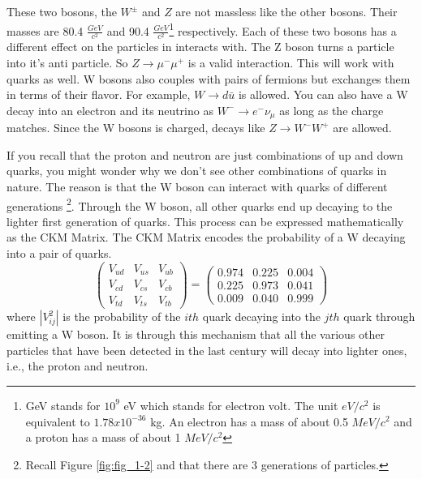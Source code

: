 These two bosons, the $W^{\pm}$ and $Z$ are not massless like the other bosons. Their masses are 80.4 $\frac{GeV}{c^2}$ and 90.4 $\frac{GeV}{c^2}$\footnote{GeV stands for $10^9$ eV which stands for electron volt. The unit $eV/c^2$ is equivalent to $1.78 x 10^{-36}$ kg. An electron has a mass of about 0.5 $MeV/c^2$ and a proton has a mass of about 1 $MeV/c^2$} respectively.
Each of these two bosons has a different effect on the particles in interacts with. The Z boson turns a particle into it's anti particle. So $ Z \rightarrow \mu^- \mu^+$ is a valid interaction. This will work with quarks as well.
W bosons also couples with pairs of fermions but exchanges them in terms of their flavor. For example, $W \rightarrow d \bar{u}$ is allowed.
You can also have a W decay into an electron and its neutrino as $W^- \rightarrow e^- \nu_{\mu}$ as long as the charge matches. Since the W bosons is charged, 
decays like $Z \rightarrow W^- W^+$ are allowed.

If you recall that the proton and neutron are just combinations of up and down quarks, you might wonder why we don't see other combinations of quarks in nature.
The reason is that the W boson can interact with quarks of different generations \footnote{Recall Figure \ref{fig:fig_1-2} and that there are 3 generations of particles.}. 
Through the W boson, all other quarks end up decaying to the lighter first generation of quarks. This process can be expressed mathematically as the CKM Matrix. The CKM Matrix encodes the probability of a W decaying into a pair of quarks. 
\begin{equation}
   \begin{pmatrix}
      V_{ud} & V_{us} & V_{ub}\\
      V_{cd} & V_{cs} & V_{cb}\\
      V_{td} & V_{ts} & V_{tb} 
   \end{pmatrix}
   = 
   \begin{pmatrix}
       0.974 & 0.225 & 0.004 \\
       0.225 & 0.973 & 0.041 \\
       0.009 & 0.040 & 0.999
   \end{pmatrix}
   \label{eq:eq_CKM}
\end{equation}
where $|V_{ij}^2|$ is the probability of the $ith$ quark decaying into the $jth$ quark through emitting a W boson.
It is through this mechanism that all the various other particles that have been detected in the last century will decay into lighter ones, i.e., the proton and neutron.

